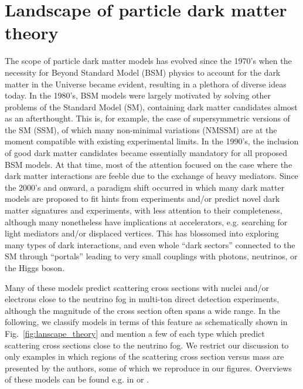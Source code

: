 \section{Landscape of particle dark matter theory}
\label{sec:theory}




The scope of particle dark matter models has evolved since the 1970's when the necessity for Beyond Standard Model (BSM) physics to account for the dark matter in the Universe became evident, resulting in a plethora of diverse ideas today. In the 1980's, BSM models were largely motivated by solving other problems of the Standard Model (SM), containing dark matter candidates almost as an afterthought. This is, for example, the case of supersymmetric versions of the SM (SSM), of which many non-minimal variations (NMSSM) are at the moment compatible with existing experimental limits. In the 1990's, the inclusion of good dark matter candidates became essentially mandatory for all proposed BSM models. At that time, most of the attention focused on the case where the dark matter interactions are feeble due to the exchange of heavy mediators. Since the 2000's and onward, a paradigm shift occurred in which many dark matter models are proposed to fit hints from experiments and/or predict novel dark matter signatures and experiments, with less attention to their completeness, although many nonetheless have implications at accelerators, e.g. searching for light mediators and/or displaced vertices. This has blossomed into exploring many types of dark interactions, and even whole “dark sectors” connected to the SM through “portals” leading to very small couplings with photons, neutrinos, or the Higgs boson. 

 Many of these models predict scattering cross sections with nuclei and/or electrons close to the neutrino fog in multi-ton direct detection experiments, although the magnitude of the cross section often spans a wide range. In the following, we classify models in terms of this feature as schematically shown in Fig.~\ref{fig:lanscape_theory} and mention a few of each type which predict scattering cross sections close to the neutrino fog. We restrict our discussion to only examples in which regions of the scattering cross section versus mass are presented by the authors, some of which we reproduce in our figures. Overviews of these models can be found e.g. in \cite{Battaglieri:2017aum}  or \cite{Billard:2021uyg}. 
 
